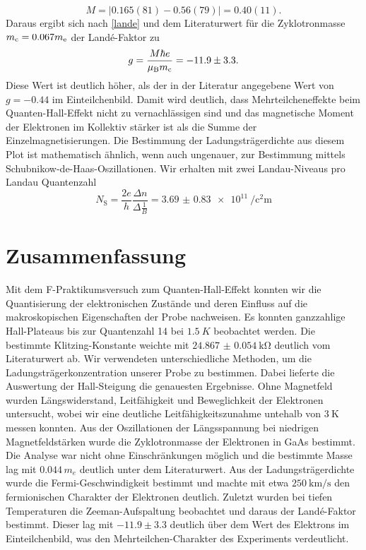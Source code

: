 \documentclass[paper=a4,fontsize=10pt,DIV=18,twocolumn,parskip=half]{scrartcl}
\numberwithin{equation}{section}    %
\newcommand{\kor}[1]{{\color{darkgreen}#1}}
\begin{document}
\kor{\begin{equation}
M=\left| 0.165(81)-0.56(79)\right|=0.40(11).
\end{equation}}
Daraus ergibt sich nach  \eqref{lande} und dem Literaturwert für die Zyklotronmasse $m_{\rm c}=0.067 m_{\rm e} $ \cite{saarland} der Landé-Faktor zu
\kor{
\begin{equation}
g=\frac{M \hbar e}{\mu_{\rm B} m_{\rm c}}=-11.9\pm3.3.
\end{equation}
}
Diese Wert ist deutlich höher, als der in der Literatur \citep{anleitung} angegebene Wert von $g=-0.44$ im Einteilchenbild. Damit wird deutlich, dass Mehrteilcheneffekte beim Quanten-Hall-Effekt nicht zu vernachlässigen sind und das magnetische Moment der Elektronen im Kollektiv stärker ist als die Summe der Einzelmagnetisierungen.
Die Bestimmung der Ladungsträgerdichte aus diesem Plot ist mathematisch ähnlich, wenn auch ungenauer, zur Bestimmung mittels Schubnikow-de-Haas-Oszillationen.
Wir erhalten mit zwei Landau-Niveaus pro Landau Quantenzahl
\begin{equation}
N_\mathrm{S}=\frac{2e}{h}\frac{\Delta n}{\Delta \frac{1}{B}}=\SI{3.69(083)e11}{\per\square\centi\meter}
\end{equation}

\section{Zusammenfassung}
\label{Zusammenfassung}
\kor{
Mit dem F-Praktikumsversuch zum Quanten-Hall-Effekt konnten wir die Quantisierung
der elektronischen Zustände und deren Einfluss auf die makroskopischen Eigenschaften 
der Probe nachweisen. Es konnten ganzzahlige Hall-Plateaus bis zur Quantenzahl 14 bei 
$\SI{1.5}{K}$ beobachtet werden. Die bestimmte Klitzing-Konstante weichte 
mit $\SI{24.867(54)}{\kilo\ohm}$ deutlich vom Literaturwert ab.
Wir verwendeten unterschiedliche Methoden, um die Ladungsträgerkonzentration unserer
Probe zu bestimmen. Dabei lieferte die Auswertung der Hall-Steigung die genauesten 
Ergebnisse. Ohne Magnetfeld wurden Längswiderstand, Leitfähigkeit und Beweglichkeit 
der Elektronen untersucht, wobei wir eine deutliche Leitfähigkeitszunahme untehalb von 
$\SI{3}{\kelvin}$ messen konnten. Aus der Oszillationen der Längsspannung bei niedrigen 
Magnetfeldstärken wurde die Zyklotronmasse der Elektronen in GaAs bestimmt. Die 
Analyse war nicht ohne Einschränkungen möglich und die bestimmte Masse lag mit $0.044\,m_e$ deutlich unter dem Literaturwert. Aus der Ladungsträgerdichte wurde die Fermi-Geschwindigkeit 
bestimmt und machte mit etwa $\SI[per-mode=symbol]{250}{\kilo\meter\per\second}$ den fermionischen Charakter
der Elektronen deutlich. Zuletzt wurden bei tiefen Temperaturen die Zeeman-Aufspaltung 
beobachtet und daraus der Landé-Faktor bestimmt. Dieser lag mit $-11.9\pm3.3$ deutlich über
dem Wert des Elektrons im Einteilchenbild, was den Mehrteilchen-Charakter des Experiments
verdeutlicht.
}
\end{document}
